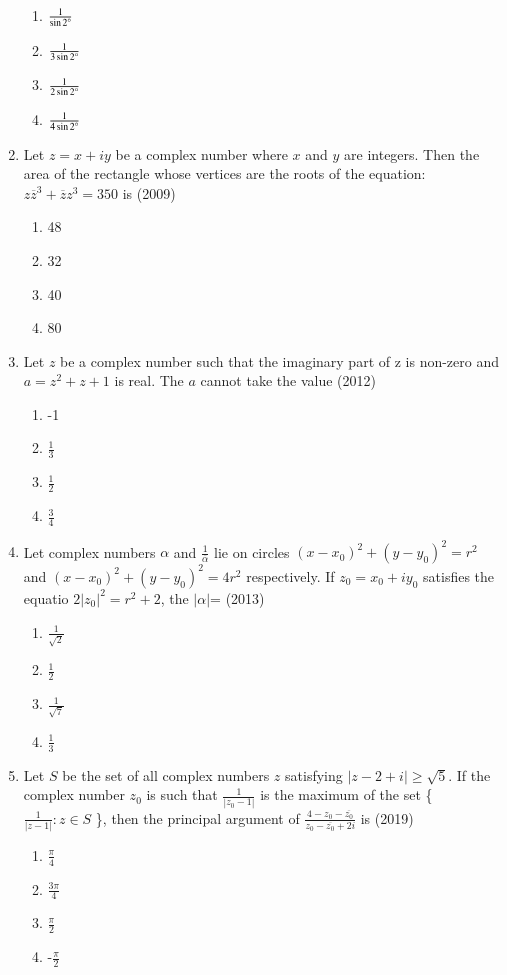 \documentclass[journal,12pt,twocolumn]{IEEEtran}
\theoremstyle{remark}
\begin{document}
\begin{enumerate}
\begin{enumerate}[label=(\alph*)]
	\item $\frac{1}{\sin 2\degree}$
	\item $\frac{1}{3\sin 2\degree}$
	\item $\frac{1}{2\sin 2\degree}$
	\item $\frac{1}{4\sin 2\degree}$
\end{enumerate}
\item Let $z=x+iy$ be a complex number where $x$ and $y$ are integers. Then the area of the rectangle whose vertices are the roots of the equation: $z\overline{z}^{3}+\overline{z}z^{3}=350$ is \hfill{(2009)}
\begin{enumerate}[label=(\alph*)]
	\item 48
	\item 32
	\item 40
	\item 80
\end{enumerate}
\item Let $z$ be a complex number such that the imaginary part of z is non-zero and $a=z^{2}+z+1$ is real. The $a$ cannot take the value \hfill{(2012)}
\begin{enumerate}[label=(\alph*)]
	\item -1
	\item $\frac{1}{3}$
	\item $\frac{1}{2}$
	\item $\frac{3}{4}$
\end{enumerate}
\item Let complex numbers $\alpha$ and $\frac{1}{\overline{\alpha}}$ lie on circles $(x-x_{0})^{2}+(y-y_{0})^{2}=r^{2}$ and $(x-x_{0})^{2}+(y-y_{0})^{2}=4r^{2}$ respectively. If $z_{0}=x_{0}+iy_{0}$ satisfies the equatio  $2|z_{0}| ^{2}=r^{2}+2$, the $|\alpha|$= \hfill{(2013)}
\begin{enumerate}[label=(\alph*)]
	\item $\frac{1}{\sqrt{2}}$
	\item $\frac{1}{2}$
	\item $\frac{1}{\sqrt{7}}$
	\item $\frac{1}{3}$
\end{enumerate}
\item Let $S$ be the set of all complex numbers $z$ satisfying $|z-2+i|\geq\sqrt{5}$. If the complex number $z_{0}$ is such that $\frac{1}{|z_{0}-1|}$ is the maximum of the set \{ $\frac{1}{|z-1|} : z \in S$ \}, then the principal argument of $\frac{4-z_{0}-\overline{z_{0}}}{z_{0}-\overline{z_{0}}+2i}$ is  \hfill{(2019)}
\begin{enumerate}[label=(\alph*)]
	\item $\frac{\pi}{4}$
	\item $\frac{3\pi}{4}$
	\item $\frac{\pi}{2}$
	\item -$\frac{\pi}{2}$
\end{enumerate}
\end{enumerate}
\end{document}
